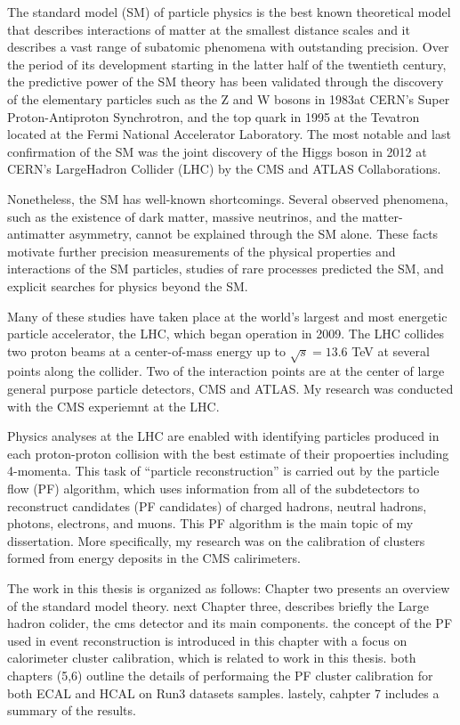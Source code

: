 
The standard model (SM) of particle physics %
is the best known theoretical model that describes interactions of matter at the smallest %
distance scales and it describes a vast range of subatomic phenomena with outstanding precision.
Over the period of its development starting in the latter half of the twentieth century, the predictive power of the SM theory has been validated through the discovery of the elementary particles such as the Z and W bosons in 1983at CERN's Super Proton-Antiproton Synchrotron, and the top quark in 1995 at the Tevatron located at the Fermi National Accelerator Laboratory.
The most notable and last confirmation of the SM was the joint discovery of the Higgs boson in 2012 at CERN's LargeHadron Collider (LHC) by the CMS and ATLAS Collaborations.

Nonetheless, the SM has well-known shortcomings.
Several observed phenomena, such as the existence of dark matter, massive neutrinos, and the matter-antimatter asymmetry, cannot be explained through the SM alone.
These facts motivate further precision measurements of the physical properties and interactions of the SM particles, studies of rare processes predicted the SM, and explicit searches for physics beyond the SM.

Many of these studies have taken place at the world's largest and most energetic particle accelerator, the LHC, which began operation in 2009.
The LHC collides two proton beams at a center-of-mass energy up to $\sqrt{s}=13.6$ TeV at several points along the collider.
Two of the interaction points are at the center of large general purpose particle detectors, CMS and ATLAS.
My research was conducted with the CMS experiemnt at the LHC.

Physics analyses at the LHC are enabled with identifying particles produced in each proton-proton collision with the best estimate of their propoerties including 4-momenta.
This task of ``particle reconstruction'' is carried out by the particle flow (PF) algorithm, which uses information from all of the subdetectors
to reconstruct candidates (PF candidates) of charged hadrons, neutral hadrons, photons, electrons, and muons.
This PF algorithm is the main topic of my dissertation.
More specifically, my research was on the calibration of clusters formed from energy deposits in the CMS calirimeters.


The work in this thesis is organized as follows:
Chapter two presents an overview of the standard model theory. 
next Chapter three, describes briefly the Large hadron colider, the cms detector and its main components. 
the concept of the PF used in event reconstruction  is introduced in this chapter with a focus on calorimeter cluster calibration, which is related to work in this thesis. 
both chapters (5,6) outline the details of performaing the PF cluster calibration for both ECAL and HCAL on Run3 datasets samples. 
lastely, cahpter 7 includes a summary of the results. 
